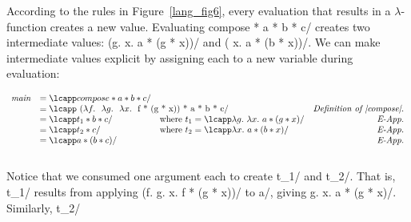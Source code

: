 \documentclass[12pt]{report}
\begin{document}

\noindent According to the rules in Figure~\ref{lang_fig6}, every
evaluation that results in a $\lambda$-function creates a new
value. Evaluating \lcapp compose * a * b * c/ creates two intermediate
values: \lcapp (\lcabs g. \lcabs x. a * (g * x))/ and \lcapp (\lcabs
x. a * (b * x))/. We can make intermediate values explicit by
assigning each to a new variable during evaluation:

\begin{singlespace}\noindent
  \begin{math}\begin{array}{lllr}
    \lcname main/ &= \lcapp compose * a * b * c/ \\
    &= \rlap{\lcapp (\lcabs f. \lcabs g. \lcabs x. f * (g * x)) * a * b * c/} & & \hfil\text{\emph{Definition of |compose|.}} \\
    &= \lcapp t_1 * b * c/ & \text{where\ } t_1 = \lcapp \lcabs g. \lcabs x. a * (g * x)/  & \hfil\text{\emph{E-App.}}\\
    &= \lcapp t_2 * c/ & \text{where\ } t_2 = \lcapp \lcabs x. a * (b * x)/ & \hfil\text{\emph{E-App.}}\\
    &= \lcapp a * (b * c)/ & & \hfil\text{\emph{E-App.}} \\[-\baselineskip]
    \multicolumn{4}{l}{\hbox to \hsize{}}
  \end{array}\end{math}
\end{singlespace}

Notice that we consumed one argument each to create \lcname t_1/ and
\lcname t_2/. That is, \lcname t_1/ results from applying \lcapp
(\lcabs f. \lcabs g. \lcabs x. f * (g * x))/ to \lcname a/, giving
\lcapp \lcabs g. \lcabs x. a * (g * x)/. Similarly, \lcname t_2/
\end{document}
